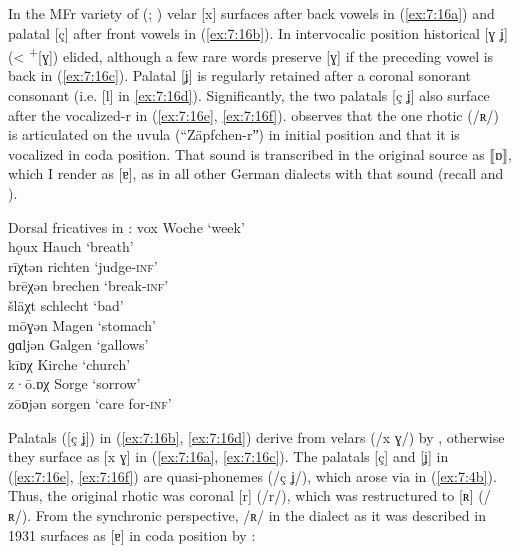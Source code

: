 In the MFr variety of  (\citealt{Palgen1931}; ) velar [x] surfaces after back vowels in (\ref{ex:7:16a}) and palatal [ç] after front vowels in (\ref{ex:7:16b}). In intervocalic position historical [ɣ ʝ] (< \textsuperscript{+}[ɣ]) elided, although a few rare words preserve [ɣ] if the preceding vowel is back in (\ref{ex:7:16c}). Palatal [ʝ] is regularly retained after a coronal sonorant consonant (i.e. [l] in \ref{ex:7:16d}). Significantly, the two palatals [ç ʝ] also surface after the vocalized-r in (\ref{ex:7:16e}, \ref{ex:7:16f}). \citet[6]{Palgen1931} observes that the one rhotic (/ʀ/) is articulated on the uvula (“Zäpfchen-rˮ) in initial position and that it is vocalized in coda position. That sound is transcribed in the original source as ⟦ɒ⟧, which I render as [ɐ], as in all other German dialects with that sound (recall  and ).

\ea%
\label{ex:7:16}Dorsal fricatives in :
\ea\label{ex:7:16a} vox \tab [vox] \tab Woche \tab ‘week’ \\
hǫux \tab [hɔux] \tab Hauch \tab ‘breath’ \\
\ex\label{ex:7:16b} rīχtən \tab [ʀiːçtən] \tab richten \tab ‘judge\textsc{{}-inf}’ \\
brēχən \tab [bʀeːçən] \tab brechen \tab ‘break\textsc{{}-inf}’ \\
šläχt \tab [ʃlæçt] \tab schlecht \tab ‘bad’ \\
\ex\label{ex:7:16c} mōɣən \tab [moːɣǝn] \tab Magen \tab ‘stomach’ \\
\ex\label{ex:7:16d} ɡɑljən \tab [gɑlʝən] \tab Galgen \tab ‘gallows’ \\
\ex\label{ex:7:16e} kīɒχ \tab [kiːɐç] \tab Kirche \tab ‘church’ \\
\ex\label{ex:7:16f} z·ō.ɒχ \tab [zoːɐç] \tab Sorge \tab ‘sorrow’ \\
zōɒjən \tab [zoːɐʝən] \tab sorgen \tab ‘care for\textsc{{}-inf}’ \\
\z
\z 

Palatals ([ç ʝ]) in (\ref{ex:7:16b}, \ref{ex:7:16d}) derive from velars (/x ɣ/) by , otherwise they surface as [x ɣ] in (\ref{ex:7:16a}, \ref{ex:7:16c}). The palatals [ç] and [ʝ] in (\ref{ex:7:16e}, \ref{ex:7:16f}) are quasi-phonemes (/ç ʝ/), which arose via  in (\ref{ex:7:4b}). Thus, the original rhotic was coronal [r] (/r/), which was restructured to [ʀ] (/ʀ/). From the synchronic perspective, /ʀ/ in the dialect as it was described in 1931 surfaces as [ɐ] in coda position by :\largerpage[-1]\pagebreak

